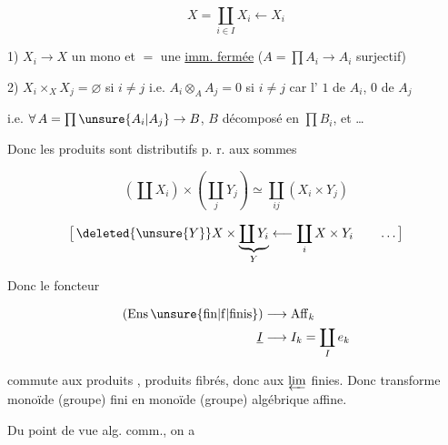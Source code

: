 \[
X=\coprod_{i\in I}X_i\longleftarrow X_i
\]

1) $X_i\to X$ un mono et $=$ une \uline{imm. fermée} \qquad ($A=\prod A_i\to A_i$ surjectif)

2) $X_i\times_X X_j=\varnothing$ si $i\ne j$ \qquad i.e. $A_i\otimes_A A_j=0$ si $i\ne j$ car l' $1$ de $A_i$, $0$ de $A_j$ 


i.e. $\forall\,A=\prod\unsure{A_i|A_j}\to B$, $B$ décomposé en $\prod B_i$, et \ldots

 Donc les produits  sont distributifs p. r. aux sommes

\[
\left(\coprod X_i\right)\times\left(\coprod_j Y_j\right)\simeq\coprod_{ij}(X_i\times Y_j)
\]

\[
\bigl[\,\deleted{\unsure{Y}}X\times\underbrace{\coprod Y_i}_{Y}\longleftarrow\coprod_i X\times Y_i\qquad\ldots\,\bigr]
\]


Donc le foncteur

\[
\begin{aligned}
(\mathrm{Ens}\,\unsure{\mathrm{fin}|\mathrm f|\mathrm{finis}})&\longrightarrow\mathrm{Aff}_k\\
\underline I&\longrightarrow I_k=\coprod_I e_k
\end{aligned}
\]

commute aux  produits ,   produits fibrés, donc aux $\varprojlim$ finies. Donc transforme monoïde (groupe) fini en monoïde (groupe) algébrique affine.

Du point de vue alg. comm., on a

